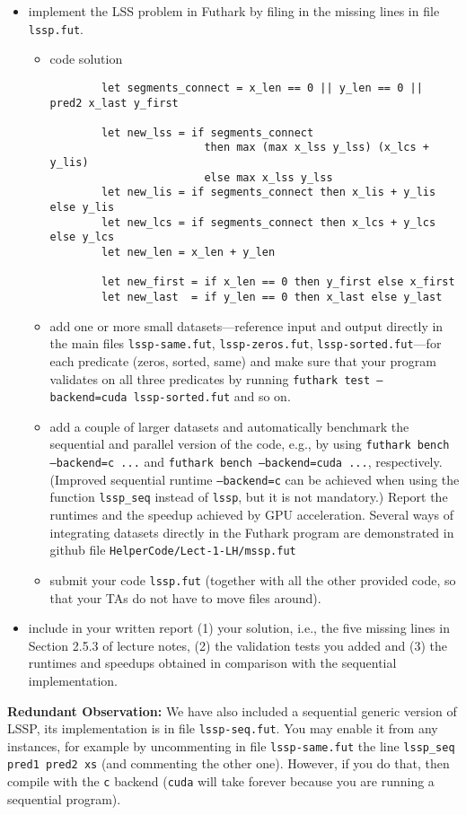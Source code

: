\documentclass{article}
\begin{document}
\begin{itemize}
    \item implement the LSS problem in Futhark by filing in the missing lines in file \texttt{lssp.fut}.  
    \begin{itemize}
        \item code solution
        \begin{lstlisting}
        let segments_connect = x_len == 0 || y_len == 0 || pred2 x_last y_first

        let new_lss = if segments_connect
                        then max (max x_lss y_lss) (x_lcs + y_lis)
                        else max x_lss y_lss
        let new_lis = if segments_connect then x_lis + y_lis else y_lis
        let new_lcs = if segments_connect then x_lcs + y_lcs else y_lcs
        let new_len = x_len + y_len

        let new_first = if x_len == 0 then y_first else x_first
        let new_last  = if y_len == 0 then x_last else y_last

        \end{lstlisting}
        \item add one or more small datasets---reference input and output directly in the main files \texttt{lssp-same.fut}, \texttt{lssp-zeros.fut}, \texttt{lssp-sorted.fut}---for each predicate (zeros, sorted, same) and make sure that your program validates on all three predicates by running \texttt{futhark test --backend=cuda lssp-sorted.fut} and so on.
        \item add a couple of larger datasets and automatically benchmark the sequential and parallel version of the code, e.g., by using \texttt{futhark bench --backend=c ...} and \texttt{futhark bench --backend=cuda ...}, respectively. (Improved sequential runtime \texttt{--backend=c} can be achieved when using the function \texttt{lssp\_seq} instead of \texttt{lssp}, but it is not mandatory.)  Report the runtimes and the speedup achieved by GPU acceleration.  Several ways of integrating datasets directly in the Futhark program are demonstrated in github file \texttt{HelperCode/Lect-1-LH/mssp.fut}
        \item submit your code \texttt{lssp.fut} (together with all the other provided code, so that your TAs do not have to move files around).
    \end{itemize}
    \item include in your written report (1) your solution,  i.e., the five missing lines in Section 2.5.3 of lecture notes, (2) the validation tests you added and (3) the runtimes and speedups obtained in comparison with the sequential implementation. 
\end{itemize}

\textbf{Redundant Observation:} We have also included a sequential generic version of LSSP, its implementation is in file \texttt{lssp-seq.fut}. You may enable it from any instances, for example by uncommenting in file \texttt{lssp-same.fut} the line \texttt{lssp\_seq pred1 pred2 xs} (and commenting the other one). However, if you do that, then compile with the \texttt{c} backend (\texttt{cuda} will take forever because you are running a sequential program). 
\end{document}
